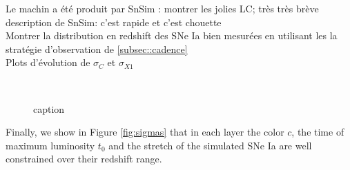 \documentclass[\docopts]{\docclass}
\begin{document}
Le machin a été produit par SnSim : montrer les jolies LC; très très brève description de SnSim: c'est rapide et c'est chouette \\
Montrer la distribution en redshift des SNe Ia bien mesurées en utilisant les la stratégie d'observation de \ref{subsec::cadence} \\
Plots d'évolution de $\sigma_C$ et $\sigma_{X1}$

\begin{figure}[t]
\begin{center}
\\
\caption{caption}
\label{fig:lc_examples}
\end{center}
\end{figure}

Finally, we show in Figure \ref{fig:sigmas} that in each layer the color $c$, the time of maximum luminosity $t_0$ and the stretch of the simulated SNe Ia are well constrained over their redshift range.
\end{document}
